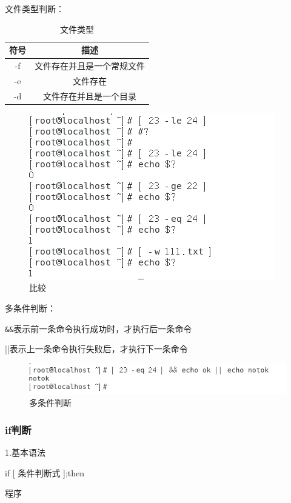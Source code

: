 \documentclass{ctexart}
\begin{document}
	文件类型判断：
	
	\begin{table}[h]
		\centering
		\caption{文件类型}
		\begin{tabular}{|c|c|}
			\hline
			符号 & 描述  \\
			\hline
			-f & 文件存在并且是一个常规文件 \\
			\hline
			-e & 文件存在\\
			\hline
			-d &文件存在并且是一个目录\\ 
			\hline
		\end{tabular}
	\end{table}
	
	
	\begin{figure}[H]
		\centering
		\includegraphics{2.17}
		\caption{比较}
	\end{figure}
	
	多条件判断：
	
	\verb|&&|表示前一条命令执行成功时，才执行后一条命令
	
	\verb||||表示上一条命令执行失败后，才执行下一条命令
	
	\begin{figure}[H]
		\centering
		\includegraphics{2.18}
		\caption{多条件判断}
	\end{figure}
	
	\subsubsection{if判断}
	1.基本语法
	
	if [ 条件判断式 ];then
	
	\quad \quad 程序
	
\end{document}
